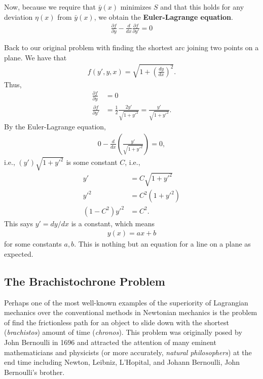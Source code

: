 \documentclass{article}
\newcommand{\p}{\partial}
\newcommand{\f}[2]{\frac{#1}{#2}}
\newcommand{\lp}{\left(}
\newcommand{\rp}{\right)}
\begin{document}
Now, because we require that $\bar{y}(x)$ minimizes $S$ and that this holds for any deviation $\eta(x)$ from $\bar{y}(x)$, we obtain the \textbf{Euler-Lagrange equation}. 
\begin{align}
\boxed{\f{\p f}{\p y} - \f{d}{dx}\f{\p f}{\p y'} = 0}
\end{align}

Back to our original problem with finding the shortest arc joining two points on a plane. We have that
\begin{align}
f(y',y,x) = \sqrt{1 + \lp\f{dy}{dx}\rp^2}.
\end{align}
Thus,
\begin{align}
\f{\p f}{\p y} &= 0\\
\f{\p f}{\p y'} &= \f{1}{2}\f{2y'}{\sqrt{1 + y'^2}} = \f{y'}{\sqrt{1 + y'^2}}.
\end{align}
By the Euler-Lagrange equation, 
\begin{align}
0 - \f{d}{dx}\lp \f{y'}{\sqrt{1 + y'^2}} \rp = 0,
\end{align}
i.e., $(y')\sqrt{1 + y'^2}$ is some constant $C$, i.e.,
\begin{align}
y' &= C\sqrt{1 + y'^2}\nonumber\\
y'^2 &= C^2(1+y'^2)\nonumber\\
(1 - C^2)y'^2 &= C^2.
\end{align} 
This says $y' = dy/dx$ is a constant, which means 
\begin{align}
y(x) = ax + b
\end{align} 
for some constants $a,b$. This is nothing but an equation for a line on a plane as expected.

\subsection{The Brachistochrone Problem}

Perhaps one of the most well-known examples of the superiority of Lagrangian mechanics over the conventional methods in Newtonian mechanics is the problem of find the frictionless path for an object to slide down with the shortest (\textit{brachistos}) amount of time (\textit{chronos}). This problem was originally posed by John Bernoulli in 1696 and attracted the attention of many eminent mathematicians and physicists (or more accurately, \textit{natural philosophers}) at the end time including Newton, Leibniz, L'Hopital, and Johann Bernoulli, John Bernoulli's brother. 
\end{document}
